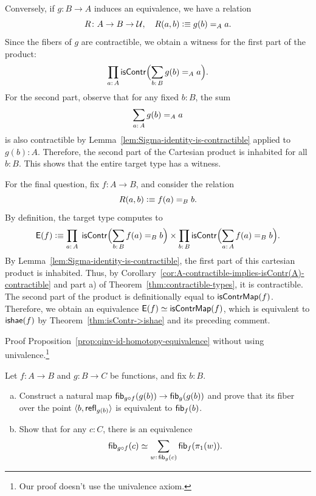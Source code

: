 \begin{solution}
    Conversely, if $g\colon B\to A$ induces an equivalence, we have a relation
    \[
        R\colon A\to B\to\univ,\quad
        R(a,b)\defeq g(b)\eq{A}a.
    \]
    Since the fibers of $g$ are contractible, we obtain a witness for the first part of the product:
    \[
        \prod_{a\colon A}\fun{isContr}
            \Bigl(
                \sum_{b\colon B}g(b)\eq{A}a
            \Bigr).
    \]
    For the second part, observe that for any fixed $b\colon B$, the sum
    \[
        \sum_{a\colon A}g(b)\eq{A}a
    \]
    is also contractible by Lemma~\ref{lem:Sigma-identity-is-contractible} applied to $g(b)\colon A$. Therefore, the second part of the Cartesian product is inhabited for all $b\colon B$. This shows that the entire target type has a witness.

    \bigskip

    For the final question, fix\/ $f\colon A\to B$, and consider the relation
    \[
        R(a,b)\mathrel{\vcentcolon}\equiv f(a)\mathrel{=_{B}}b.
    \]
    By definition, the target type computes to
    \[
        \fun{E}(f)
            \defeq
                \prod_{a\colon A}\;
                \fun{isContr}
                    \Bigl(
                        \sum_{b\colon B}f(a)\eq Bb
                    \Bigr)
                \times
                \prod_{b\colon B}
                    \fun{isContr}
                        \Bigl(
                            \sum_{a\colon A}f(a)\eq Bb
                        \Bigr).
    \]
    By Lemma~\ref{lem:Sigma-identity-is-contractible}, the first part of this cartesian product is inhabited. Thus, by Corollary~\ref{cor:A-contractible-implies-isContr(A)-contractible} and part a) of Theorem~\ref{thm:contractible-types}, it is contractible. The second part of the product is definitionally equal to\/ $\mathsf{isContrMap}(f)$.     Therefore, we obtain an equivalence $\mathsf{E}(f)\simeq\mathsf{isContrMap}(f)$,    
    which is equivalent to\/ $\mathsf{ishae}(f)$ by Theorem~\ref{thm:isContr->ishae} and its preceding comment.
\end{solution}

\begin{exr}
    Proof\/ {\upshape Proposition~\ref{prop:qinv-id-homotopy-equivalence}} without using univalence.\footnote{Our proof doesn't use the univalence axiom.}
\end{exr}

\begin{exr}%
    Let\/ $f\colon A\to B$ and\/ $g\colon B\to C$ be functions, and fix\/ $b\colon B$.
    \begin{enumerate}[a),font=\upshape]
        \item Construct a natural map\/ $\mathsf{fib}_{g\circ f}(g(b))\to\mathsf{fib}_g(g(b))$ and prove that its fiber over the point\/ $\langle b,\mathsf{refl}_{g(b)}\rangle$ is equivalent to\/ $\mathsf{fib}_f(b)$.
        \item Show that for any\/ $c\colon C$, there is an equivalence
        \[
            \fun{fib}_{g\circ f}(c)\simeq\sum_{w\colon\fun{fib}_g(c)}\fun{fib}_f(\pi_1(w)).
        \]
    \end{enumerate}
\end{exr}

